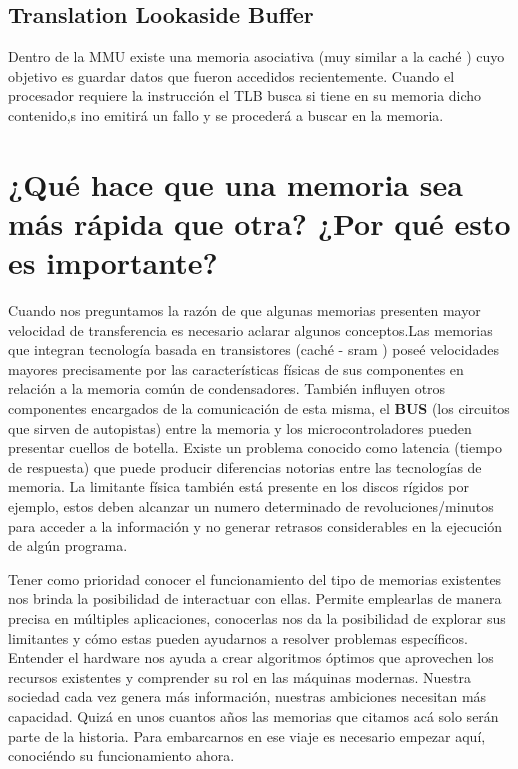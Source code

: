 \documentclass{article}
\begin{document}
\subsection{Translation  Lookaside  Buffer}
Dentro de la MMU
 existe una memoria asociativa (muy similar a la caché
) cuyo objetivo es guardar datos que fueron accedidos recientemente. Cuando el procesador requiere la instrucción el TLB
 busca si tiene en su memoria dicho contenido,s ino emitirá un fallo y se procederá a buscar en la memoria.
\section{¿Qué hace que una memoria sea más rápida que otra? ¿Por qué esto es importante?} 

Cuando nos preguntamos la razón de que algunas memorias presenten mayor velocidad de transferencia es necesario aclarar algunos conceptos.Las memorias que integran tecnología basada en transistores (caché - sram
) poseé velocidades mayores precisamente por las características físicas de sus componentes en relación a la memoria común de condensadores. También influyen otros componentes encargados de la comunicación de esta misma, el \textbf
{BUS} (los circuitos que sirven de autopistas) entre la memoria y los microcontroladores pueden presentar cuellos de botella. Existe un problema conocido como latencia (tiempo de respuesta) que puede producir diferencias notorias entre las tecnologías de memoria.
La limitante física también está presente en los discos rígidos por ejemplo, estos deben alcanzar un numero determinado de revoluciones/minutos para acceder a la información y no generar retrasos considerables en la ejecución de algún programa.

Tener como prioridad conocer el funcionamiento del tipo de memorias existentes nos brinda la posibilidad de interactuar con ellas. Permite emplearlas de manera precisa en 
múltiples aplicaciones, conocerlas nos da la posibilidad de explorar sus limitantes y cómo estas pueden ayudarnos a resolver problemas específicos.
Entender el hardware nos ayuda a crear algoritmos óptimos que aprovechen los recursos existentes y comprender su rol en las máquinas modernas.
Nuestra sociedad cada vez genera más información, nuestras ambiciones necesitan más capacidad. Quizá en unos cuantos años las memorias que citamos acá solo serán parte de la historia. Para embarcarnos en ese viaje es necesario empezar aquí, conociéndo su funcionamiento ahora.


\cite{rebollo}
\cite{figura1}
\cite{ucm}
\end{document}
